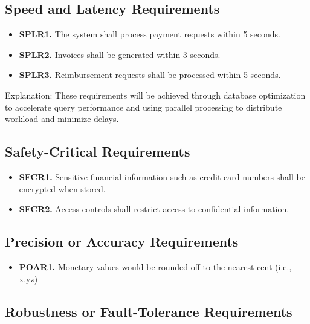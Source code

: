 \documentclass[12pt]{article}
\begin{document}
\subsection{Speed and Latency Requirements}

\label{SPLR}

\begin{itemize}
    \item \hypertarget{SPLROne}{ \textbf{SPLR1.} The system shall process payment requests within 5 seconds. }
    \item \hypertarget{SPLRTwo}{ \textbf{SPLR2.} Invoices shall be generated within 3 seconds. }
    \item \hypertarget{SPLRThree}{ \textbf{SPLR3.} Reimbursement requests shall be processed within 5 seconds. }
\end{itemize}
Explanation: These requirements will be achieved through database optimization to accelerate query performance and using parallel processing to distribute workload and minimize delays.

\subsection{Safety-Critical Requirements}

\label{SFCR}

\begin{itemize}
    \item \hypertarget{SFCROne}{ \textbf{SFCR1.} Sensitive financial information such as credit card numbers shall be encrypted when stored. }
    \item \hypertarget{SFCRTwo}{ \textbf{SFCR2.} Access controls shall restrict access to confidential information. }
\end{itemize}

\subsection{Precision or Accuracy Requirements}

\label{POAR}

\begin{itemize}
    \item \hypertarget{POAROne}{ \textbf{POAR1.} Monetary values would be rounded off to the nearest cent (i.e., x.yz) }
\end{itemize}

\subsection{Robustness or Fault-Tolerance Requirements}
\end{document}
